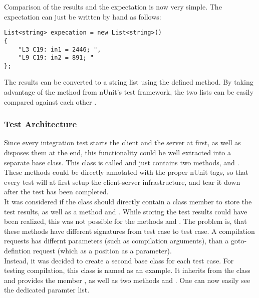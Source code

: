Comparison of the results and the expectation is now very simple. The expectation can just be written by hand as follows:

\begin{lstlisting}[caption={Expectation}, captionpos=b, label={lst:testexpectation}]
List<string> expecation = new List<string>()
{
    "L3 C19: in1 = 2446; ",
    "L9 C19: in2 = 891; "
};
\end{lstlisting}

The results can be converted to a string list using the defined  method. By taking advantage of the method  from nUnit's test framework, the two lists can be easily compared against each other \cite{nunitCollectionAssert}.

\subsubsection{Test Architecture}
Since every integration test starts the client and the server at first, as well as disposes them at the end, this functionality could be well extracted into a separate base class. This class is called  and just contains two methods,  and . These methods could be directly annotated with the proper nUnit tags, so that every test will at first setup the client-server infrastructure, and tear it down after the test has been completed.\\
It was considered if the  class should directly contain a class member\linebreak {} to store the test results, as well as a method  and . While storing the test results could have been realized, this was not possible for the methods  and . The problem is, that these methods have different signatures from test case to test case. A compilation requests has differnt parameters (such as compilation arguments), than a goto-defintion request (which as a position as a parameter).\\
Instead, it was decided to create a second base class for each test case. For testing compilation, this class is named  as an example. It inherits from the  class and provides the member , as well as two methods  and . One can now easily see the dedicated paramter list.\\
